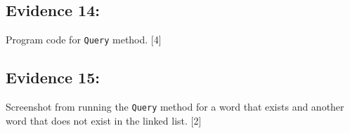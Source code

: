 \subsection*{Evidence 14: }

Program code for \texttt{Query} method. \hfill{}{[}4{]}

\subsection*{Evidence 15: }

Screenshot from running the \texttt{Query} method for a word that
exists and another word that does not exist in the linked list. \hfill{}{[}2{]}